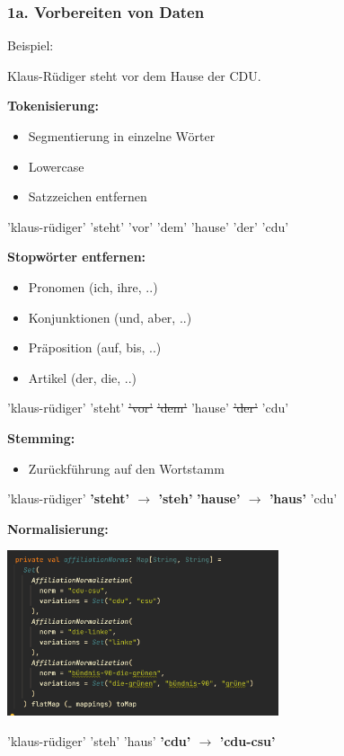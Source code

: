 \documentclass{beamer}
\begin{document}
\begin{frame}[allowframebreaks]
  \frametitle{1a. Vorbereiten von Daten}

  Beispiel:

  Klaus-Rüdiger steht vor dem Hause der CDU.

  \break

  \textbf{Tokenisierung:}

  \begin{itemize}
    \item Segmentierung in einzelne Wörter
    \item Lowercase
    \item Satzzeichen entfernen
  \end{itemize}

  \bigskip
  'klaus-rüdiger' 'steht' 'vor' 'dem' 'hause' 'der' 'cdu'

  \break

  \textbf{Stopwörter entfernen:}

  \medskip

  {\scriptsize
    \begin{itemize}
      \item Pronomen (ich, ihre, ..)
      \item Konjunktionen (und, aber, ..)
      \item Präposition (auf, bis, ..)
      \item Artikel (der, die, ..)
    \end{itemize}
  }

  \bigskip

  'klaus-rüdiger' 'steht' \sout{'vor'} \sout{'dem'} 'hause' \sout{'der'} 'cdu'

  \break

  \textbf{Stemming:}

  \bigskip

  \begin{itemize}
    \item Zurückführung auf den Wortstamm
  \end{itemize}

  \bigskip

  'klaus-rüdiger' \textbf{'steht' $\rightarrow$ 'steh'} \textbf{'hause' $\rightarrow$ 'haus'} 'cdu'

  \break

  \textbf{Normalisierung:}

  \includegraphics[width=8cm]{normalisierung}

  \bigskip

  'klaus-rüdiger' 'steh' 'haus' \textbf{'cdu' $\rightarrow$ 'cdu-csu'}
\end{frame}
\end{document}
